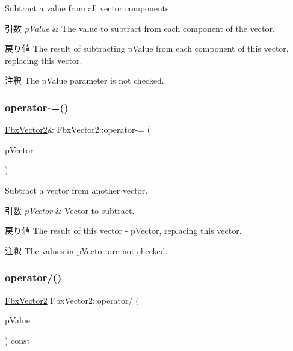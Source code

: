 Subtract a value from all vector components. 
\begin{DoxyParams}{引数}
{\em p\+Value} & The value to subtract from each component of the vector. \\
\hline
\end{DoxyParams}
\begin{DoxyReturn}{戻り値}
The result of subtracting p\+Value from each component of this vector, replacing this vector. 
\end{DoxyReturn}
\begin{DoxyRemark}{注釈}
The p\+Value parameter is not checked. 
\end{DoxyRemark}
\mbox{\label{class_fbx_vector2_a7a84b5172b0bbe90d4eaea8e06b0d7fe}} 
\subsubsection{\texorpdfstring{operator-\/=()}{operator-=()}\hspace{0.1cm}{\footnotesize\ttfamily [2/2]}}
{\footnotesize\ttfamily \hyperlink{class_fbx_vector2}{Fbx\+Vector2}\& Fbx\+Vector2\+::operator-\/= (\begin{DoxyParamCaption}\item[{const \hyperlink{class_fbx_vector2}{Fbx\+Vector2} \&}]{p\+Vector }\end{DoxyParamCaption})}

Subtract a vector from another vector. 
\begin{DoxyParams}{引数}
{\em p\+Vector} & Vector to subtract. \\
\hline
\end{DoxyParams}
\begin{DoxyReturn}{戻り値}
The result of this vector -\/ p\+Vector, replacing this vector. 
\end{DoxyReturn}
\begin{DoxyRemark}{注釈}
The values in p\+Vector are not checked. 
\end{DoxyRemark}
\mbox{\label{class_fbx_vector2_a4ce28019385c003ced7bc9c3278ab41a}} 
\subsubsection{\texorpdfstring{operator/()}{operator/()}\hspace{0.1cm}{\footnotesize\ttfamily [1/2]}}
{\footnotesize\ttfamily \hyperlink{class_fbx_vector2}{Fbx\+Vector2} Fbx\+Vector2\+::operator/ (\begin{DoxyParamCaption}\item[{double}]{p\+Value }\end{DoxyParamCaption}) const}

